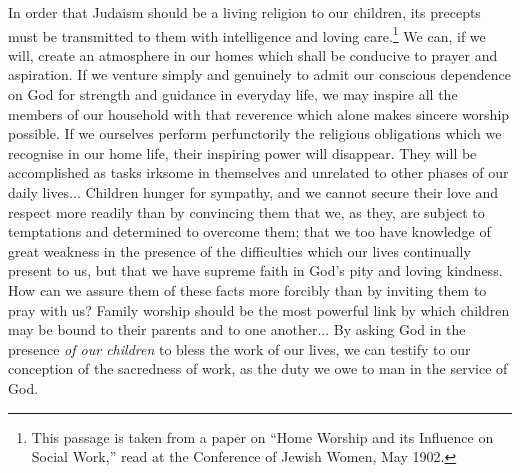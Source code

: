 In order that Judaism should be a living
religion to our children, its precepts must be
transmitted to them with intelligence and
loving care.\footnote{This passage is taken
from a paper on “Home Worship
and its Influence on Social Work,”
read at the Conference
of Jewish Women, May 1902.}
We can, if we will, create an
atmosphere in our homes which shall be
conducive to prayer and aspiration. If we
venture simply and genuinely to admit our
conscious dependence on God for strength
and guidance in everyday life, we may inspire
all the members of our household
with that reverence which alone makes
sincere worship possible. If we ourselves
perform perfunctorily the religious obligations
which we recognise in our home life, their
inspiring power will disappear. They will
be accomplished as tasks irksome in themselves
and unrelated to other phases of our
daily lives... Children hunger for sympathy,
and we cannot secure their love and
respect more readily than by convincing
them that we, as they, are subject to temptations
and determined to overcome them; that
we too have knowledge of great weakness in
the presence of the difficulties which our
lives continually present to us, but that we
have supreme faith in God’s pity and loving
kindness. How can we assure them of these
facts more forcibly than by inviting them to
pray with us? Family worship should be
the most powerful link by which children
may be bound to their parents and to one
another... By asking God in the presence
\textsl{of our children} to bless the work of our
lives, we can testify to our conception of the
sacredness of work, as the duty we owe to
man in the service of God.

